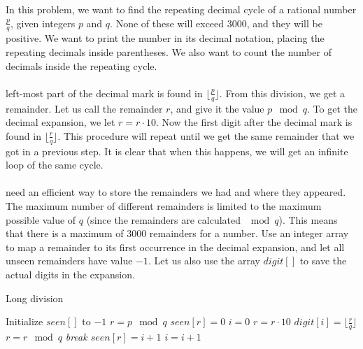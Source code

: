 \documentclass[11pt,a4paper,twoside]{article}
\begin{document}
In this problem, we want to find the repeating decimal cycle of a rational
number $\frac{p}{q}$, given integers $p$ and $q$. None of these will exceed
$3000$, and they will be positive. We want to print the number in its decimal
notation, placing the repeating decimals inside parentheses. We also want to
count the number of decimals inside the repeating cycle.
\\\\
 left-most part of the decimal mark is found in
$\lfloor{\frac{p}{q}}\rfloor$. From this division, we get a remainder. Let us call
the remainder $r$, and give it the value $p \mod q$. To get the decimal expansion,
we let $r = r \cdot 10$. Now the first digit after the decimal mark is found in
$\lfloor{\frac{r}{q}}\rfloor$. This procedure will repeat until we get the same
remainder that we got in a previous step. It is clear that when this happens, we
will get an infinite loop of the same cycle.
\\\\
 need an efficient way to store the remainders we had and where they
appeared. The maximum number of different remainders is limited to the maximum
possible value of $q$ (since the remainders are calculated $\mod q$). This means
that there is a maximum of $3000$ remainders for a number. Use an integer array to
map a remainder to its first occurrence in the decimal expansion, and let all unseen
remainders have value $-1$.  Let us also use the array $digit[]$ to save the actual
digits in the expansion.


\begin{algorithm}
    \caption{Long division}
    \label{lst:Long division}
    \begin{algorithmic}
        \STATE Initialize $seen[]$ to $-1$
        \STATE $r = p \mod q$
        \STATE $seen[r] = 0$ 
        \STATE $i = 0$
            \STATE $r = r \cdot 10$
            \STATE $digit[i] = \lfloor\frac{r}{q}\rfloor$
            \STATE $r = r \mod q$
                \STATE {}
                \STATE \em{break} %
            \ENDIF
            \STATE $seen[r] = i + 1 $
            \STATE $ i = i + 1$
        \ENDWHILE
    \end{algorithmic}
\end{algorithm}
\end{document}
